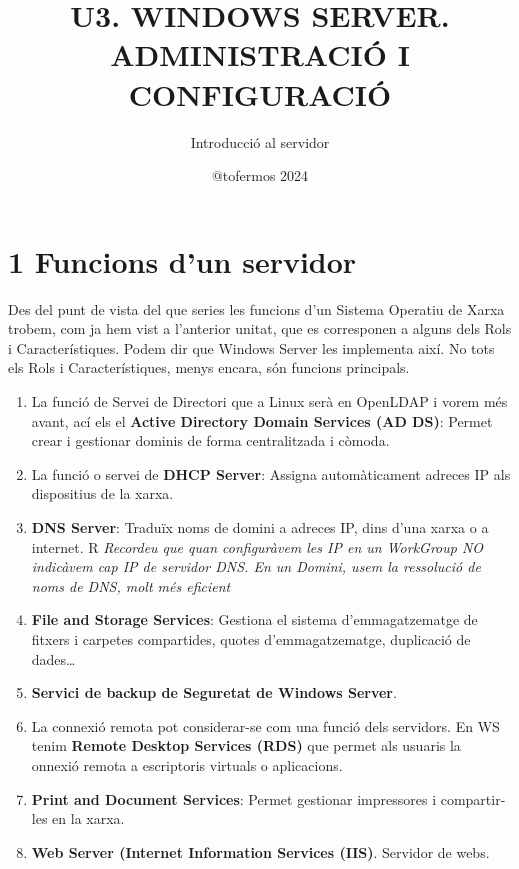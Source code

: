 \documentclass[
  a4paper,
]{article}
\title{U3. WINDOWS SERVER. ADMINISTRACIÓ I CONFIGURACIÓ}
\subtitle{Introducció al servidor}
\author{@tofermos 2024}
\date{}
\begin{document}
\maketitle

{
\setcounter{tocdepth}{2}
\tableofcontents
}
\newpage
\renewcommand\tablename{Tabla}

\section{1 Funcions d'un servidor}\label{funcions-dun-servidor}

Des del punt de vista del que series les funcions d'un Sistema Operatiu
de Xarxa trobem, com ja hem vist a l'anterior unitat, que es corresponen
a alguns dels Rols i Característiques. Podem dir que Windows Server les
implementa així. No tots els Rols i Característiques, menys encara, són
funcions principals.

\begin{enumerate}
\def\labelenumi{\arabic{enumi}.}
\item
  La funció de Servei de Directori que a Linux serà en OpenLDAP i vorem
  més avant, ací els el \textbf{Active Directory Domain Services (AD
  DS)}: Permet crear i gestionar dominis de forma centralitzada i
  còmoda.
\item
  La funció o servei de \textbf{DHCP Server}: Assigna automàticament
  adreces IP als dispositius de la xarxa.
\item
  \textbf{DNS Server}: Traduïx noms de domini a adreces IP, dins d'una
  xarxa o a internet. R \emph{Recordeu que quan configuràvem les IP en
  un WorkGroup NO indicàvem cap IP de servidor DNS. En un Domini, usem
  la ressolució de noms de DNS, molt més eficient}
\item
  \textbf{File and Storage Services}: Gestiona el sistema
  d'emmagatzematge de fitxers i carpetes compartides, quotes
  d'emmagatzematge, duplicació de dades\ldots{}
\item
  \textbf{Servici de backup de Seguretat de Windows Server}.
\item
  La connexió remota pot considerar-se com una funció dels servidors. En
  WS tenim \textbf{Remote Desktop Services (RDS)} que permet als usuaris
  la onnexió remota a escriptoris virtuals o aplicacions.
\item
  \textbf{Print and Document Services}: Permet gestionar impressores i
  compartir-les en la xarxa.
\item
  \textbf{Web Server (Internet Information Services (IIS)}. Servidor de
  webs.
\end{enumerate}
\end{document}
